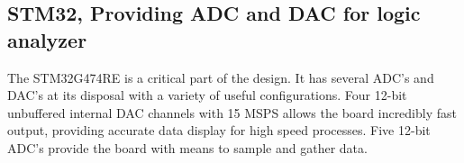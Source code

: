 \subsection{STM32, Providing ADC and DAC for logic analyzer}
The STM32G474RE is a critical part of the design. It has several ADC's and DAC's at its disposal with a variety of useful configurations. Four 12-bit unbuffered internal DAC channels with 15 MSPS allows the board incredibly fast output, providing accurate data display for high speed processes. Five 12-bit ADC's provide the board with means to sample and gather data.